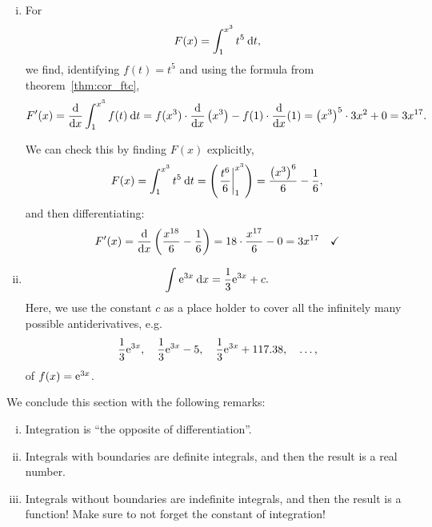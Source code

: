 \begin{example}
\begin{enumerate}[(i)]
	\item For 
	\[ F(x) = \int_{1}^{x^3} t^5 \: \mathrm{d} t, \]
	we find, identifying $f(t)=t^5$ and using the formula from theorem~\ref{thm:cor_ftc},
	\[ F'(x) = \displaystyle{\frac{\mathrm{d}}{\mathrm{d}x}} \int_{1}^{x^3} f(t) \: \mathrm{d} t
	= f(x^3)\cdot\displaystyle{\frac{\mathrm{d}}{\mathrm{d}x}}\left(x^3\right) - f(1)\cdot\displaystyle{\frac{\mathrm{d}}{\mathrm{d}x}}(1) 
	= \left(x^3\right)^5 \cdot 3x^2 + 0 = 3x^{17}. \]
	
	We can check this by finding $F(x)$ explicitly,
	\[ F(x) = \int_{1}^{x^3} t^5 \: \mathrm{d} t 
	= \left(\left. \frac{t^6}{6} \right|_1^{x^3}\right)
	= \frac{\left(x^3\right)^6}{6} - \frac{1}{6}, \]
	and then differentiating:
	\[ F'(x) = \displaystyle{\frac{\mathrm{d}}{\mathrm{d}x}} \left( \frac{x^{18}}{6} - \frac{1}{6} \right) 
	= 18\cdot\frac{x^{17}}{6} - 0 = 3x^{17} \quad \text{\checkmark}\]
	\item \[ \int_{}^{} \mathrm{e}^{3x} \: \mathrm{d} x = \frac{1}{3} \mathrm{e}^{3x} + c. \]
	Here, we use the constant $c$ as a place holder to cover all the infinitely many possible antiderivatives, e.g.
	\[ \frac{1}{3} \mathrm{e}^{3x}, \quad \frac{1}{3} \mathrm{e}^{3x} - 5, \quad
	\frac{1}{3} \mathrm{e}^{3x} + 117.38, \quad \dots, \]
	of $f(x)=\mathrm{e}^{3x}$.
\end{enumerate}	
\end{example}

\begin{remark}
We conclude this section with the following remarks:
\begin{enumerate}[(i)]
	\item Integration is ``the opposite of differentiation''.
	\item Integrals with boundaries are definite integrals, and then the result is a real number.
	\item Integrals without boundaries are indefinite integrals, and then the result is a function! Make sure to not forget the constant of integration!
\end{enumerate}
\end{remark}

